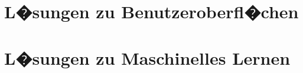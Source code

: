 \documentclass[enabledeprecatedfontcommands, fontsize=12pt,
     open=right, a4paper,
     twoside, DIV=11,
     abstractoff,
     headsepline,
     numbers=noenddot,
     BCOR=15mm,
     headings=standardclasses,
     headings=big]{scrbook}
\begin{document}
\section{L�sungen zu Benutzeroberfl�chen}
\section{L�sungen zu Maschinelles Lernen}
%
\end{document}
